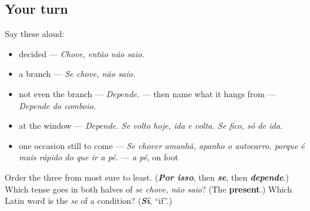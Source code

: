 \subsection*{Your turn}
Say these aloud:

\begin{itemize}
\raggedright
  \item decided — \emph{Chove, então não saio.}
  \item a branch — \emph{Se chove, não saio.}
  \item not even the branch — \emph{Depende.} — then name what it hangs from — \emph{Depende do comboio.}
  \item at the window — \emph{Depende. Se volto hoje, ida e volta. Se fico, só de ida.}
  \item one occasion still to come — \emph{Se chover amanhã, apanho o autocarro, porque é mais rápido do que ir a pé.} — \emph{a pé}, on foot
\end{itemize}

\begin{tcolorbox}[breakable,colback=teal!4,colframe=teal!35!black,title={Before you move on}]
Order the three from most sure to least. (\emph{\textbf{Por isso}}, then \emph{\textbf{se}}, then \emph{\textbf{depende}}.) Which tense goes in both halves of \emph{se chove, não saio}? (The \textbf{present}.) Which Latin word is the \emph{se} of a condition? (\emph{\textbf{Sī}}, \textquotedblleft{}if\textquotedblright{}.)
\end{tcolorbox}
